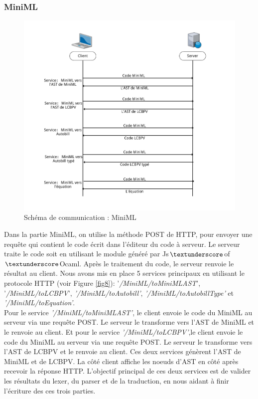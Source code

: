 \documentclass[12pt]{article}
\begin{document}
\hypertarget{schuxe9ma-de-communication}{%
      \subsubsection{MiniML}\label{schuxe9ma-de-communication}}

\begin{figure}[!b]
      \centering
      \includegraphics[scale=0.5]{Figures/CommunicationMiniML.png}
      \caption{Schéma de communication : MiniML\label{fig9}}
\end{figure}


Dans la partie MiniML, on utilise la méthode POST de HTTP, pour envoyer une requête qui contient le code écrit dans l'éditeur du code à serveur. Le serveur traite le code soit en utilisant le module généré par Js$\textunderscore$of$\textunderscore$Ocaml. Après le traitement du code, le serveur renvoie le résultat au client. Nous avons mis en place 5 services principaux en utilisant le protocole HTTP (voir Figure \ref{fig8}): '\emph{/MiniML/toMiniMLAST}', '\emph{/MiniML/toLCBPV}', \emph{'/MiniML/toAutobill'}, \emph{'/MiniML/toAutobillType'} et \emph{'/MiniML/toEquation'}. \\

Pour le service \emph{'/MiniML/toMiniMLAST'}, le client envoie le code du MiniML au serveur via une requête POST. Le serveur le transforme vers l'AST de MiniML et le renvoie au client. Et pour le service \emph{'/MiniML/toLCBPV'},le client envoie le code du MiniML au serveur via une requête POST. Le serveur le transforme vers l'AST de LCBPV et le renvoie au client. Ces deux services génèrent l'AST de MiniML et de LCBPV. La côté client affiche les noeuds d'AST en côté après recevoir la réponse HTTP. L'objectif principal de ces deux services est de valider les résultats du lexer, du parser et de la traduction, en nous aidant à finir l'écriture des ces trois parties.\\
\end{document}
